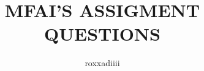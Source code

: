 \documentclass[18pt]{article}
\begin{document}
	\title{MFAI'S ASSIGMENT QUESTIONS}
	\author{roxxadiiii}
	\maketitle
\end{document}
